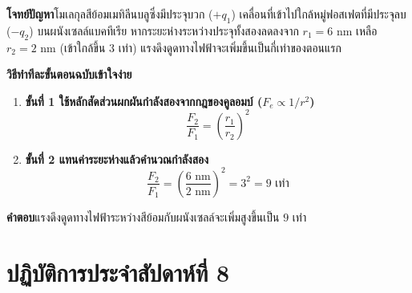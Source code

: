 \vspace{4pt}


\begin{worked}
\textbf{โจทย์ปัญหา}\quad โมเลกุลสีย้อมเมทิลีนบลูซึ่งมีประจุบวก ($+q_1$) เคลื่อนที่เข้าไปใกล้หมู่ฟอสเฟตที่มีประจุลบ ($-q_2$) บนผนังเซลล์แบคทีเรีย หากระยะห่างระหว่างประจุทั้งสองลดลงจาก $r_1 = 6\text{ nm}$ เหลือ $r_2 = 2\text{ nm}$ (เข้าใกล้ขึ้น $3$ เท่า) แรงดึงดูดทางไฟฟ้าจะเพิ่มขึ้นเป็นกี่เท่าของตอนแรก

\textbf{วิธีทำทีละขั้นตอนฉบับเข้าใจง่าย}
\begin{enumerate}
    \item \textbf{ขั้นที่ 1 ใช้หลักสัดส่วนผกผันกำลังสองจากกฎของคูลอมบ์ ($F_e \propto 1/r^2$)}
    \[
        \frac{F_2}{F_1} = \left(\frac{r_1}{r_2}\right)^2
    \]
    \item \textbf{ขั้นที่ 2 แทนค่าระยะห่างแล้วคำนวณกำลังสอง}
    \[
        \frac{F_2}{F_1} = \left(\frac{6\text{ nm}}{2\text{ nm}}\right)^2 = 3^2 = 9\text{ เท่า}
    \]
\end{enumerate}
\textbf{คำตอบ}\quad แรงดึงดูดทางไฟฟ้าระหว่างสีย้อมกับผนังเซลล์จะเพิ่มสูงขึ้นเป็น $9$ เท่า
\end{worked}

\section{ปฏิบัติการประจำสัปดาห์ที่ 8}


